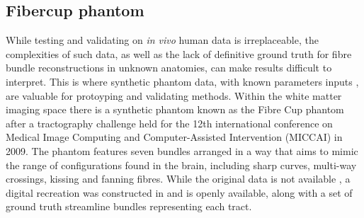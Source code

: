 \subsection{Fibercup phantom}


While testing and validating on \textit{in vivo} human data is irreplaceable, the complexities of such data, as well as the lack of definitive ground truth for fibre bundle reconstructions in unknown anatomies, can make results difficult to interpret.
This is where synthetic phantom data, with known parameters inputs , are valuable for protoyping and validating methods.
Within the white matter imaging space there is a synthetic phantom known as the Fibre Cup phantom after a tractography challenge held for the 12th international conference on Medical Image Computing and Computer-Assisted Intervention (MICCAI) in 2009.
The phantom features seven bundles arranged in a way that aims to mimic the range of configurations found in the brain, including sharp curves, multi-way crossings, kissing and fanning fibres.
While the original data is not available , a digital recreation was constructed in  and is openly available, along with a set of ground truth streamline bundles representing each tract. 

